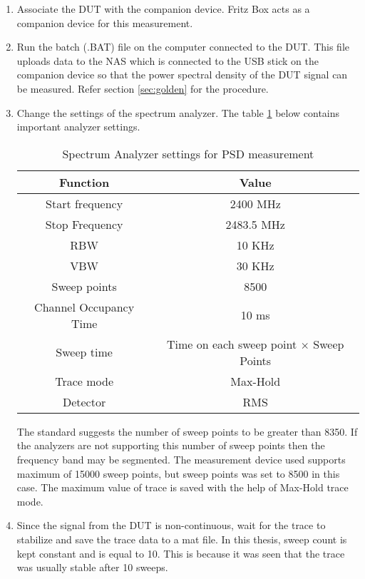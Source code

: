 \begin{enumerate}
  \item Associate the \acs{DUT} with the companion device. Fritz Box acts as a companion device for this measurement. 
\item Run the batch (.BAT) file on the computer connected to the \acs{DUT}. This file uploads data to the \ac{NAS} which is connected to the USB stick on the companion device so that the power spectral density of the \acs{DUT} signal can be measured. Refer section \ref{sec:golden} for the procedure.
\item Change the settings of the spectrum analyzer. The table \ref{tab:analyzerpsd} below contains important analyzer settings.
\begin{table}[H]
\begin{center}
\begin {tabular} {|c|c|} 
\toprule
Function & Value \\ 
\midrule 
Start frequency & 2400 MHz \\
Stop Frequency  & 2483.5 MHz\\
\ac{RBW} & 10 KHz \\
\ac{VBW} & 30 KHz\\
Sweep points & 8500 \\
Channel Occupancy Time & 10 ms \\
Sweep time & Time on each sweep point $\times$ Sweep Points \\
Trace mode & Max-Hold \\
Detector & \ac{RMS}\\
\bottomrule
\end{tabular} 
\caption{Spectrum Analyzer settings for \ac{PSD} measurement}
\label{tab:analyzerpsd}
\end{center}
\end{table}
The standard suggests the number of sweep points to be greater than 8350. If the analyzers are not supporting this number of sweep points then the frequency band may be segmented. The measurement device used supports maximum of 15000 sweep points, but sweep points was set to 8500 in this case. The maximum value of trace is saved with the help of Max-Hold trace mode. 
  
\item Since the signal from the \acs{DUT} is non-continuous, wait for the trace to stabilize and save the trace data to a mat file. In this thesis, sweep count is kept constant and is equal to 10. This is because it was seen that the trace was usually stable after 10 sweeps.


\end{enumerate}
